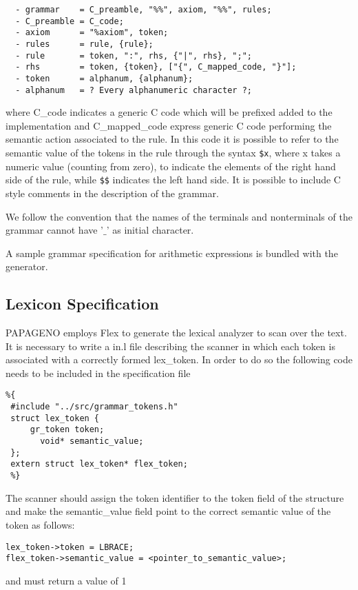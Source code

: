 \documentclass[a4paper,10pt]{article}
\begin{document}
\begin{verbatim}
  - grammar    = C_preamble, "%%", axiom, "%%", rules;
  - C_preamble = C_code;
  - axiom      = "%axiom", token;
  - rules      = rule, {rule};
  - rule       = token, ":", rhs, {"|", rhs}, ";";
  - rhs        = token, {token}, ["{", C_mapped_code, "}"];
  - token      = alphanum, {alphanum};
  - alphanum   = ? Every alphanumeric character ?;
\end{verbatim}


where C\_code indicates a  generic C code which will be prefixed added to the implementation 
and C\_mapped\_code express generic C code performing the semantic action associated to the rule.
In this code it is possible to refer to the semantic value of the tokens in the rule through the syntax \texttt{\$x}, 
where x takes a numeric value (counting from zero), to indicate the elements of the right hand side of the rule, 
while \texttt{\$\$} indicates the left hand side.
It is possible to include C style comments in the description of the grammar.

We follow the convention that the names of the terminals and nonterminals of the grammar cannot have '$\_$' as initial character. 

A sample grammar specification for arithmetic expressions is bundled with the generator.

\subsection{Lexicon Specification}

PAPAGENO employs Flex to generate the lexical analyzer to scan over the text.
It is necessary to write a in.l file describing the scanner in which each token is associated with
a correctly formed lex\_token. 
In order to do so the following code needs to be included in the specification file

\begin{verbatim}
%{
 #include "../src/grammar_tokens.h"
 struct lex_token {
     gr_token token;
       void* semantic_value;
 };
 extern struct lex_token* flex_token;
 %} 
\end{verbatim}

The scanner should assign the token identifier to the token field of the structure and make the semantic\_value field point to the correct semantic value of the token as follows:

\begin{verbatim}
lex_token->token = LBRACE;
flex_token->semantic_value = <pointer_to_semantic_value>; 
\end{verbatim}
and must return a value of 1
\end{document}
